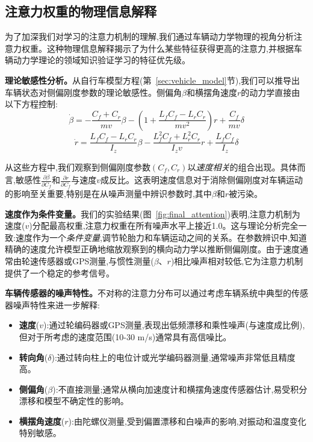 \documentclass[Afour,sageh,times]{sagej}
\begin{document}
\subsection{注意力权重的物理信息解释}
\label{sec:physics_interpretation}

为了加深我们对学习的注意力机制的理解,我们通过车辆动力学物理的视角分析注意力权重。这种物理信息解释揭示了为什么某些特征获得更高的注意力,并根据车辆动力学理论的领域知识验证学习的特征优先级。

\textbf{理论敏感性分析。}从自行车模型方程(第~\ref{sec:vehicle_model}节),我们可以推导出车辆状态对侧偏刚度参数的理论敏感性。侧偏角$\beta$和横摆角速度$r$的动力学直接由以下方程控制:
\begin{equation}
\dot{\beta} = -\frac{C_f + C_r}{mv}\beta - \left(1 + \frac{L_f C_f - L_r C_r}{mv^2}\right)r + \frac{C_f}{mv}\delta
\end{equation}
\begin{equation}
\dot{r} = \frac{L_f C_f - L_r C_r}{I_z}\beta - \frac{L_f^2 C_f + L_r^2 C_r}{I_z v}r + \frac{L_f C_f}{I_z}\delta
\end{equation}

从这些方程中,我们观察到侧偏刚度参数$(C_f, C_r)$以\textit{速度相关}的组合出现。具体而言,敏感性$\frac{\partial \dot{\beta}}{\partial C_f}$和$\frac{\partial \dot{r}}{\partial C_f}$与速度$v$成反比。这表明速度信息对于消除侧偏刚度对车辆运动的影响至关重要,特别是在从噪声测量中辨识参数时,其中$\beta$和$r$被污染。

\textbf{速度作为条件变量。}我们的实验结果(图~\ref{fig:final_attention})表明,注意力机制为速度($v$)分配最高权重,注意力权重在所有噪声水平上接近1.0。这与理论分析完全一致:速度作为一个\textit{条件变量},调节轮胎力和车辆运动之间的关系。在参数辨识中,知道精确的速度允许模型正确地缩放观察到的横向动力学以推断侧偏刚度。由于速度通常由轮速传感器或GPS测量,与惯性测量($\beta$、$r$)相比噪声相对较低,它为注意力机制提供了一个稳定的参考信号。

\textbf{车辆传感器的噪声特性。}不对称的注意力分布可以通过考虑车辆系统中典型的传感器噪声特性来进一步解释:
\begin{itemize}
    \item \textbf{速度}($v$):通过轮编码器或GPS测量,表现出低频漂移和乘性噪声(与速度成比例),但对于所考虑的速度范围(10-30 m/s)通常具有高信噪比。
    \item \textbf{转向角}($\delta$):通过转向柱上的电位计或光学编码器测量,通常噪声非常低且精度高。
    \item \textbf{侧偏角}($\beta$):不直接测量;通常从横向加速度计和横摆角速度传感器估计,易受积分漂移和模型不确定性的影响。
    \item \textbf{横摆角速度}($r$):由陀螺仪测量,受到偏置漂移和白噪声的影响,对振动和温度变化特别敏感。
\end{itemize}
\end{document}
